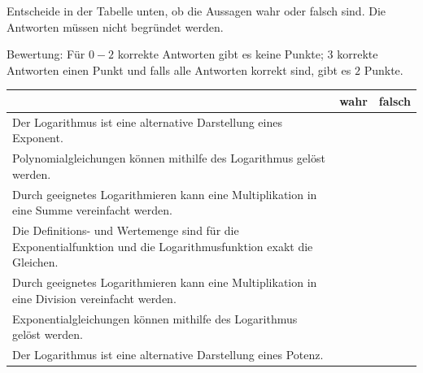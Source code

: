 \documentclass[11pt]{exam}
\begin{document}
\begin{questions}
\question[2]
Entscheide in der Tabelle unten, ob die Aussagen wahr oder falsch sind. Die Antworten müssen nicht begründet werden.\newline
\begin{small}
    Bewertung: Für $0-2$ korrekte Antworten gibt es keine Punkte; $3$ korrekte Antworten einen Punkt und falls alle Antworten korrekt sind, gibt es $2$ Punkte.
\end{small}
\begin{table}[h]
    \centering
    \begin{tabular}{|p{12cm}|c|c|}\hline
         & wahr & falsch \\\hline
        Der Logarithmus ist eine alternative Darstellung eines Exponent. & & \\\hline
        Polynomialgleichungen können mithilfe des Logarithmus gelöst werden. & & \\\hline
        Durch geeignetes Logarithmieren kann eine Multiplikation in eine Summe vereinfacht werden. & & \\\hline
        Die Definitions- und Wertemenge sind für die Exponentialfunktion und die Logarithmusfunktion exakt die Gleichen. & & \\\hline
        Durch geeignetes Logarithmieren kann eine Multiplikation in eine Division vereinfacht werden. & & \\\hline
        Exponentialgleichungen können mithilfe des Logarithmus gelöst werden. & & \\\hline
        Der Logarithmus ist eine alternative Darstellung eines Potenz. & & \\\hline
    \end{tabular}
\end{table}


\end{questions}
\end{document}
